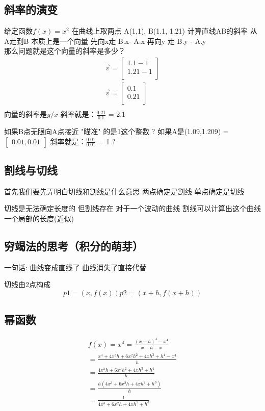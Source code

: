 \documentclass[12pt]{article}
\begin{document}
\subsection*{斜率的演变}
给定函数$f(x) = x^{2}$ 在曲线上取两点 A(1,1), B(1.1, 1.21) 计算直线AB的斜率
从A走到B 本质上是一个向量 先向x走 B.x- A.x 再向y 走 B.y - A.y\\
那么问题就是这个向量的斜率是多少？\\
\begin{align}
    \vec{v} = \begin{bmatrix}
        1.1 - 1 \\
        1.21 - 1 \\
    \end{bmatrix} \\  
        \vec{v} = \begin{bmatrix}
        0.1 \\
        0.21 \\
    \end{bmatrix} \\  
\end{align}    
$向量的斜率是 y/x$
斜率就是：$\frac{0.21}{0.1}$ = 2.1

如果B点无限向A点接近 "瞄准" 的是1这个整数 ?
如果A是(1.09,1.209)
= $\begin{bmatrix}
    0.01,
    0.01
\end{bmatrix}$
斜率就是：$\frac{0.01}{0.01}$ = 1 ?

\subsection*{割线与切线}
首先我们要先弄明白切线和割线是什么意思
两点确定是割线
单点确定是切线

切线是无法确定长度的 但割线存在 
对于一个波动的曲线 割线可以计算出这个曲线一个局部的长度(近似)

\subsection*{穷竭法的思考（积分的萌芽）}
一句话: 曲线变成直线了 曲线消失了直接代替


切线由2点构成
\[
p1 = (x, f(x))
p2 = (x+h, f(x+h))
\]

\subsection*{幂函数}
\begin{align}
f(x) = x^{4}
= \frac{(x+h)^{4} - x^{4}}{ x + h - x}\\
= \frac{x^{4}+ 4x^{3}h  + 6x^{2}h^{2}  + 4xh^{3} + h^{4} - x^{4}}{h} \\
= \frac{4x^{3}h  + 6x^{2}h^{2}  + 4xh^{3} + h^{4}}{h} \\
= \frac{h(4x^{3} + 6x^{2}h  + 4xh^{2} + h^{3})}{h}\\
= \frac{1}{4x^{3} + 6x^{2}h  + 4xh^{2} + h^{3}}
\end{align}
\end{document}
